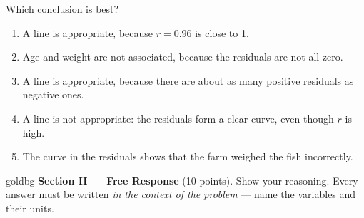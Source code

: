 \documentclass[12pt]{article}
\begin{document}
\begin{enumerate}[leftmargin=1.9em, itemsep=0.13in]
        Which conclusion is best?
        \begin{enumerate}[label=\textbf{(\Alph*)}, leftmargin=2.2em, itemsep=2pt]
          \item A line is appropriate, because $r = 0.96$ is close to 1.\hfill{}\rule[-0.2in]{0pt}{0.48in}
          \item Age and weight are not associated, because the residuals are not all zero.
          \item A line is appropriate, because there are about as many positive residuals as
                negative ones.
          \item A line is not appropriate: the residuals form a clear curve, even though $r$
                is high.
          \item The curve in the residuals shows that the farm weighed the fish incorrectly.
        \end{enumerate}

\end{enumerate}

\vspace{0.14in}

\boxguard[26]
\begin{headlinebox}{goldbg}
\small
\textbf{Section II --- Free Response} (10 points). Show your reasoning. Every answer must be
written \emph{in the context of the problem} --- name the variables and their units.
\end{headlinebox}

\vspace{0.10in}
\end{document}
